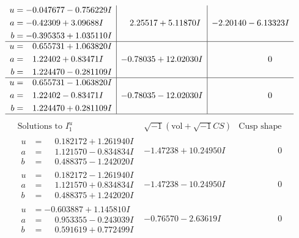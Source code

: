 \documentclass[1p]{elsarticle_modified}
\theoremstyle{definition}
\newcommand{\I}{\sqrt{-1}}
\begin{document}
$$\begin{array}{c|c|c}
\begin{aligned}
u &= -0.047677 - 0.756229 I \\
a &= -0.42309 + 3.09688 I \\
b &= -0.395353 + 1.035110 I\end{aligned}
 & \phantom{-}2.25517 + 5.11870 I & -2.20140 - 6.13323 I \\ \hline\begin{aligned}
u &= \phantom{-}0.655731 + 1.063820 I \\
a &= \phantom{-}1.22402 + 0.83471 I \\
b &= \phantom{-}1.224470 - 0.281109 I\end{aligned}
 & -0.78035 + 12.02030 I & \phantom{-0.000000 } 0 \\ \hline\begin{aligned}
u &= \phantom{-}0.655731 - 1.063820 I \\
a &= \phantom{-}1.22402 - 0.83471 I \\
b &= \phantom{-}1.224470 + 0.281109 I\end{aligned}
 & -0.78035 - 12.02030 I & \phantom{-0.000000 } 0\\
 \hline 
 \end{array}$$\newpage$$\begin{array}{c|c|c}  
\text{Solutions to }I^u_{1}& \I (\text{vol} + \sqrt{-1}CS) & \text{Cusp shape}\\
 \hline 
\begin{aligned}
u &= \phantom{-}0.182172 + 1.261940 I \\
a &= \phantom{-}1.121570 - 0.834834 I \\
b &= \phantom{-}0.488375 - 1.242020 I\end{aligned}
 & -1.47238 + 10.24950 I & \phantom{-0.000000 } 0 \\ \hline\begin{aligned}
u &= \phantom{-}0.182172 - 1.261940 I \\
a &= \phantom{-}1.121570 + 0.834834 I \\
b &= \phantom{-}0.488375 + 1.242020 I\end{aligned}
 & -1.47238 - 10.24950 I & \phantom{-0.000000 } 0 \\ \hline\begin{aligned}
u &= -0.603887 + 1.145810 I \\
a &= \phantom{-}0.953355 - 0.243039 I \\
b &= \phantom{-}0.591619 + 0.772499 I\end{aligned}
 & -0.76570 - 2.63619 I & \phantom{-0.000000 } 0 \\ \hline\begin{aligned}

\end{aligned}
\end{array}$$
\end{document}
